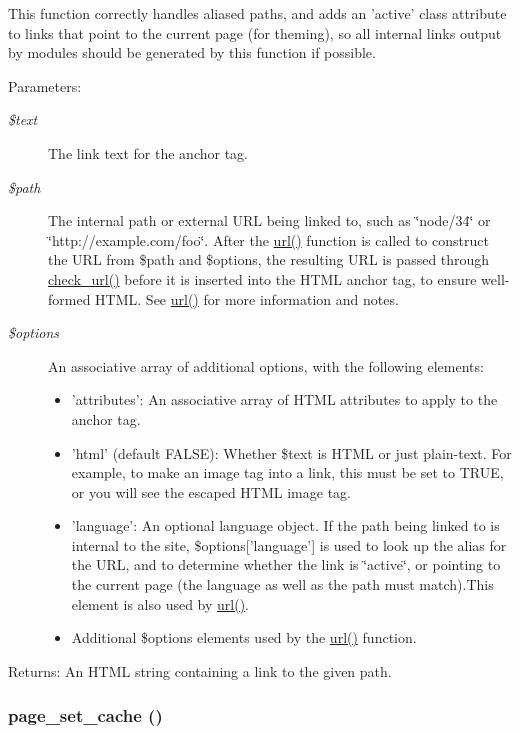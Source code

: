 This function correctly handles aliased paths, and adds an 'active' class attribute to links that point to the current page (for theming), so all internal links output by modules should be generated by this function if possible.

\begin{Desc}
\item[Parameters:]
\begin{description}
\item[{\em \$text}]The link text for the anchor tag. \item[{\em \$path}]The internal path or external URL being linked to, such as \char`\"{}node/34\char`\"{} or \char`\"{}http://example.com/foo\char`\"{}. After the \hyperlink{common_8inc_7ef60c766e2d09e18b866dacf6b9eb1f}{url()} function is called to construct the URL from \$path and \$options, the resulting URL is passed through \hyperlink{common_8inc_c024315b69035ef05c33674838707919}{check\_\-url()} before it is inserted into the HTML anchor tag, to ensure well-formed HTML. See \hyperlink{common_8inc_7ef60c766e2d09e18b866dacf6b9eb1f}{url()} for more information and notes. \item[{\em \$options}]An associative array of additional options, with the following elements:\begin{itemize}
\item 'attributes': An associative array of HTML attributes to apply to the anchor tag.\item 'html' (default FALSE): Whether \$text is HTML or just plain-text. For example, to make an image tag into a link, this must be set to TRUE, or you will see the escaped HTML image tag.\item 'language': An optional language object. If the path being linked to is internal to the site, \$options\mbox{[}'language'\mbox{]} is used to look up the alias for the URL, and to determine whether the link is \char`\"{}active\char`\"{}, or pointing to the current page (the language as well as the path must match).This element is also used by \hyperlink{common_8inc_7ef60c766e2d09e18b866dacf6b9eb1f}{url()}.\item Additional \$options elements used by the \hyperlink{common_8inc_7ef60c766e2d09e18b866dacf6b9eb1f}{url()} function.\end{itemize}
\end{description}
\end{Desc}
\begin{Desc}
\item[Returns:]An HTML string containing a link to the given path. \end{Desc}
\hypertarget{common_8inc_1e3b3fde2d48f8ef01d6ddd0a16fb073}{
\subsubsection[{page\_\-set\_\-cache}]{\setlength{\rightskip}{0pt plus 5cm}page\_\-set\_\-cache ()}}
\label{common_8inc_1e3b3fde2d48f8ef01d6ddd0a16fb073}



